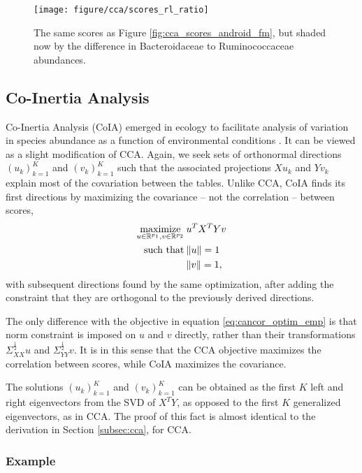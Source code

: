 \documentclass{article}
\begin{document}
\begin{figure}
  \centering
  \texttt{[image: figure/cca/scores\_rl\_ratio]}
  \caption{The same scores as Figure \ref{fig:cca_scores_android_fm}, but shaded
    now by the difference in Bacteroidaceae to Ruminococcaceae
    abundances. \label{fig:cca_scores_rl_ratio} }
\end{figure}

\subsection{Co-Inertia Analysis}

Co-Inertia Analysis (CoIA) emerged in ecology to facilitate analysis of
variation in species abundance as a function of environmental conditions
\citep{doledec1994co}. It can be viewed as a slight modification of CCA. Again,
we seek sets of orthonormal directions $\left(u_{k}\right)_{k = 1}^{K}$ and
$\left(v_{k}\right)_{k = 1}^{K}$ such that the associated projections $Xu_{k}$
and $Yv_{k}$ explain most of the covariation between the tables. Unlike CCA,
CoIA finds its first directions by maximizing the covariance -- not the
correlation -- between scores,
\begin{align*}
\mathop\mathrm{maximize}_{u \in \mathbb{R}^{p_{1}}, v \in \mathbb{R}^{p_{2}}}\medspace &u^{T}X^{T}Yv \\
\text{ such that}\medspace &\|u\| = 1\\
&\|v\| = 1,
\end{align*}
with subsequent directions found by the same optimization, after adding the
constraint that they are orthogonal to the previously derived directions.

The only difference with the objective in equation \ref{eq:cancor_optim_emp} is
that norm constraint is imposed on $u$ and $v$ directly, rather than their
transformations $\Sigma_{XX}^{\frac{1}{2}}u$ and $\Sigma_{YY}^{\frac{1}{2}}v$.
It is in this sense that the CCA objective maximizes the correlation between
scores, while CoIA maximizes the covariance.

The solutions $\left(u_{k}\right)_{k = 1}^{K}$ and $\left(v_{k}\right)_{k =
  1}^{K}$ can be obtained as the first $K$ left and right eigenvectors from the
SVD of $X^{T}Y$, as opposed to the first $K$ generalized eigenvectors, as in
CCA. The proof of this fact is almost identical to the derivation in Section
\ref{subsec:cca}, for CCA.

\subsubsection{Example}
\label{subsubsec:coia_example}
\end{document}
